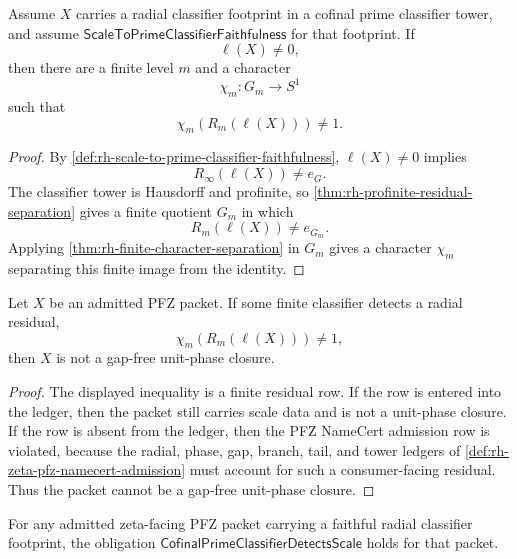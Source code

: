 \begin{theorem}
\label{thm:rh-scale-faithfulness-gives-finite-classifier-detection}
Assume $X$ carries a radial classifier footprint in a cofinal prime
classifier tower, and assume
$\mathsf{ScaleToPrimeClassifierFaithfulness}$ for that footprint.  If
$$
\ell(X)\ne0,
$$
then there are a finite level $m$ and a character
$$
\chi_m:G_m\to S^1
$$
such that
$$
\chi_m(R_m(\ell(X)))\ne1.
$$
\end{theorem}

\begin{proof}
By \autoref{def:rh-scale-to-prime-classifier-faithfulness},
$\ell(X)\ne0$ implies
$$
R_{\infty}(\ell(X))\ne e_G.
$$
The classifier tower is Hausdorff and profinite, so
\autoref{thm:rh-profinite-residual-separation} gives a finite quotient
$G_m$ in which
$$
R_m(\ell(X))\ne e_{G_m}.
$$
Applying \autoref{thm:rh-finite-character-separation} in $G_m$ gives a
character $\chi_m$ separating this finite image from the identity.
\end{proof}

\begin{theorem}
\label{thm:rh-detected-radial-residual-cannot-close}
Let $X$ be an admitted PFZ packet.  If some finite classifier detects a
radial residual,
$$
\chi_m(R_m(\ell(X)))\ne1,
$$
then $X$ is not a gap-free unit-phase closure.
\end{theorem}

\begin{proof}
The displayed inequality is a finite residual row.  If the row is
entered into the ledger, then the packet still carries scale data and is
not a unit-phase closure.  If the row is absent from the ledger, then the
PFZ NameCert admission row is violated, because the radial, phase, gap,
branch, tail, and tower ledgers of
\autoref{def:rh-zeta-pfz-namecert-admission} must account for such a
consumer-facing residual.  Thus the packet cannot be a gap-free
unit-phase closure.
\end{proof}

\begin{corollary}
\label{cor:rh-scale-faithfulness-supplies-cofinal-scale-detection}
For any admitted zeta-facing PFZ packet carrying a faithful radial
classifier footprint, the obligation
$\mathsf{CofinalPrimeClassifierDetectsScale}$ holds for that packet.
\end{corollary}

